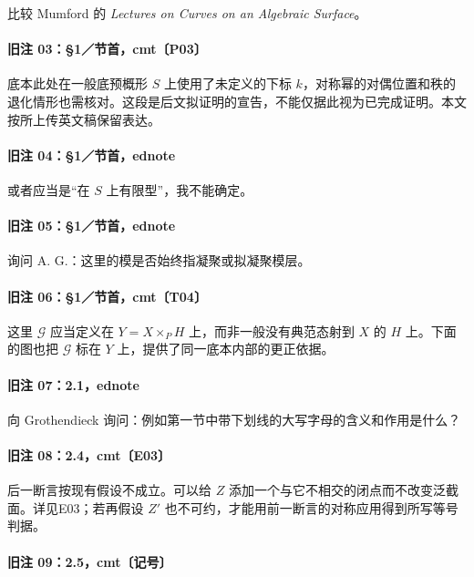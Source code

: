 \documentclass[UTF8,a4paper]{ctexbook}
\newcommand{\G}{\mathscr G}
\begin{document}
比较 Mumford 的 \textit{Lectures on Curves on an Algebraic Surface}。

\paragraph{旧注 03：§1／节首，cmt〔P03〕}

底本此处在一般底预概形 $S$ 上使用了未定义的下标 $k$，对称幂的对偶位置和秩的退化情形也需核对。这段是后文拟证明的宣告，不能仅据此视为已完成证明。本文按所上传英文稿保留表达。

\paragraph{旧注 04：§1／节首，ednote}

或者应当是“在 $S$ 上有限型”，我不能确定。

\paragraph{旧注 05：§1／节首，ednote}

询问 A. G.：这里的模是否始终指凝聚或拟凝聚模层。

\paragraph{旧注 06：§1／节首，cmt〔T04〕}

这里 $\G$ 应当定义在 $Y=X\times_PH$ 上，而非一般没有典范态射到 $X$ 的 $H$ 上。下面的图也把 $\G$ 标在 $Y$ 上，提供了同一底本内部的更正依据。

\paragraph{旧注 07：2.1，ednote}

向 Grothendieck 询问：例如第一节中带下划线的大写字母的含义和作用是什么？

\paragraph{旧注 08：2.4，cmt〔E03〕}

后一断言按现有假设不成立。可以给 $Z$ 添加一个与它不相交的闭点而不改变泛截面。详见E03；若再假设 $Z'$ 也不可约，才能用前一断言的对称应用得到所写等号判据。

\paragraph{旧注 09：2.5，cmt〔记号〕}
\end{document}
